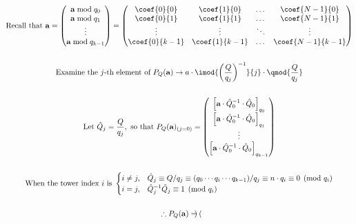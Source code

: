     \begin{gather*}
        \text{Recall that } \mathbf{a} = 
        \begin{pmatrix}
            \mathbf{a}\bmod{q_0} \\
            \mathbf{a}\bmod{q_1} \\
            \vdots \\
            \mathbf{a}\bmod{q_{k-1}}
        \end{pmatrix}
        = 
        \begin{pmatrix}
            \coef{0}{0} & \coef{1}{0} & \dots & \coef{N-1}{0} \\
            \coef{0}{1} & \coef{1}{1} & \dots & \coef{N-1}{1} \\
            \vdots & \vdots & \ddots & \vdots \\
            \coef{0}{k-1} & \coef{1}{k-1} & \dots & \coef{N-1}{k-1}
        \end{pmatrix} 
    \\
    \\
        \text{Examine the $j$-th element of } P_Q(\mathbf{a}) \to a\cdot\imod{\left(\frac{Q}{q_j}\right)^{-1}}{j} \cdot \qmod{\frac{Q}{q_j}}
    \\ 
    \\
        \text{Let } \hat{Q}_j = \frac{Q}{q_j}, \text{ so that } P_Q(\mathbf{a})_{(j=0)} = 
        \begin{pmatrix}
            \left[\mathbf{a}\cdot \hat{Q}_0^{-1}\cdot \hat{Q}_0\right]_{q_0} \\
            \left[\mathbf{a}\cdot \hat{Q}_0^{-1}\cdot \hat{Q}_0\right]_{q_1} \\
            \vdots \\
            \left[\mathbf{a}\cdot \hat{Q}_0^{-1}\cdot \hat{Q}_0\right]_{q_{k-1}}
        \end{pmatrix}
    \\
    \\
        \text{When the tower index $i$ is } 
        \begin{cases}
            i \not= j,      & \hat{Q}_j \equiv Q/q_j \equiv  ({q_0\cdots q_{i}\cdots q_{k-1}})/q_j \equiv n\cdot q_i \equiv 0 \pmod{q_i} \\
            i = j,  & \hat{Q}_j^{-1}\hat{Q}_j \equiv 1 \pmod{q_i} 
        \end{cases}
    \\
    \\
        \therefore P_Q(\mathbf{a}) = 
        \begin{pmatrix}

\end{pmatrix}
\end{gather*}
